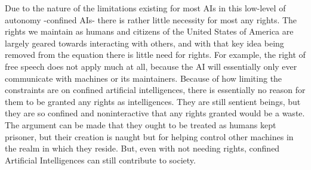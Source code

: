 Due to the nature of the limitations existing for most AIs in this low-level of autonomy -confined AIs- there is rather little necessity for most any rights. The rights we maintain as humans and citizens of the United States of America are largely geared towards interacting with others, and with that key idea being removed from the equation there is little need for rights. For example, the right of free speech does not apply much at all, because the AI will essentially only ever communicate with machines or its maintainers. Because of how limiting the constraints are on confined artificial intelligences, there is essentially no reason for them to be granted any rights as intelligences. They are still sentient beings, but they are so confined and noninteractive that any rights granted would be a waste. The argument can be made that they ought to be treated as humans kept prisoner, but their creation is naught but for helping control other machines in the realm in which they reside. But, even with not needing rights, confined Artificial Intelligences can still contribute to society.